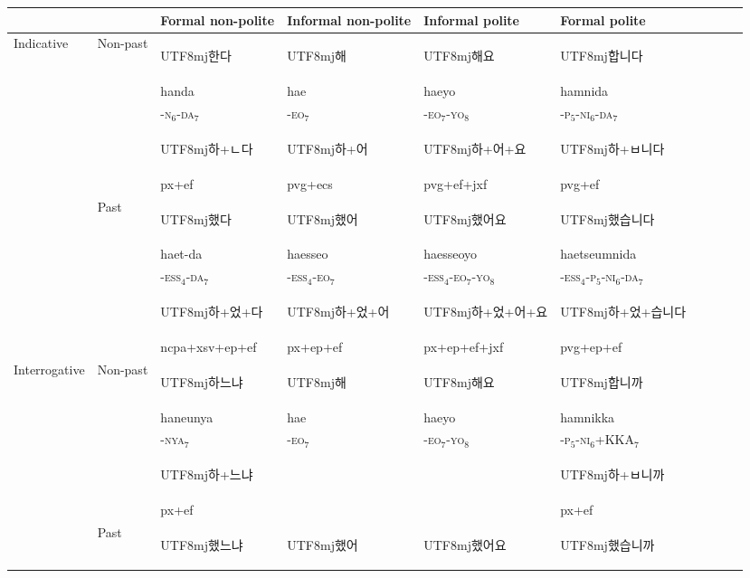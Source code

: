 \documentclass[11pt,letterpaper]{article}
\newcommand{\korean}[1]{\begin{CJK}{UTF8}{mj}#1\end{CJK}}
\begin{document}
\begin{table}
\begin{tabular}{llllllllll}
           &          &Formal non-polite & Informal non-polite & Informal polite & Formal polite \\ \hline \hline
\multirow{6}{*}{Indicative} & \multirow{3}{*}{Non-past} & \korean{한다} & \korean{해}  & \korean{해요}  & \korean{합니다}  \\
           &          & handa & hae & haeyo &  hamnida \\
           &          & -\textsc{n}$_6$-\textsc{da}$_7$ & -\textsc{eo}$_7$ & -\textsc{eo}$_7$-\textsc{yo}$_8$ &  -\textsc{p}$_5$-\textsc{ni}$_6$-\textsc{da}$_7$ \\
           &          & \korean{하+ㄴ다}  & \korean{하+어}    & \korean{하+어+요} & \korean{하+ㅂ니다} \\
            &          &  px+ef        &   pvg+ecs        & pvg+ef+jxf & pvg+ef\\
           \hline
           & \multirow{3}{*}{Past}     & \korean{했다}  & \korean{했어} & \korean{했어요}   & \korean{했습니다}  \\
           &      & haet-da &  haesseo &  haesseoyo  & haetseumnida \\
           &      & -\textsc{ess}$_4$-\textsc{da}$_7$ &  -\textsc{ess}$_4$-\textsc{eo}$_7$ &  -\textsc{ess}$_4$-\textsc{eo}$_7$-\textsc{yo}$_8$  & -\textsc{ess}$_4$-\textsc{p}$_5$-\textsc{ni}$_6$-\textsc{da}$_7$ \\
           &      &  \korean{하+었+다}  &  \korean{하+었+어} & \korean{하+었+어+요} & \korean{하+었+습니다}  \\
           &      &  ncpa+xsv+ep+ef   & px+ep+ef   &   px+ep+ef+jxf &     pvg+ep+ef\\
           \hline
\multirow{6}{*}{Interrogative} & \multirow{3}{*}{Non-past} & \korean{하느냐} & \korean{해}  & \korean{해요}  & \korean{합니까} \\
 &  & haneunya &  hae &  haeyo & hamnikka\\
 &  & -\textsc{nya}$_7$ &  -\textsc{eo}$_7$ &  -\textsc{eo}$_7$-\textsc{yo}$_8$ & -\textsc{p}$_5$-\textsc{ni}$_6$+KKA$_7$ \\
               && \korean{하+느냐} & & & \korean{하+ㅂ니까}    \\
              && px+ef & & & px+ef \\
 \hline
              & \multirow{3}{*}{Past} & \korean{했느냐} & \korean{했어} & \korean{했어요} & \korean{했습니까} \\

\end{tabular}
\end{table}
\end{document}
